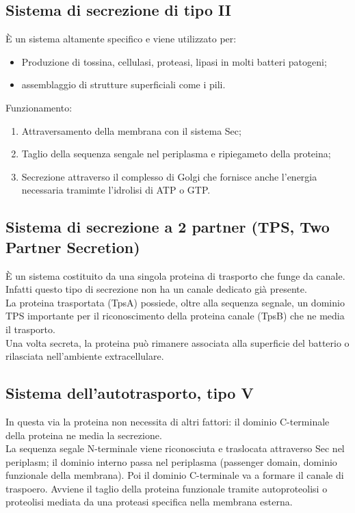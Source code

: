 \subsection{Sistema di secrezione di tipo II}
\`E un sistema altamente specifico e viene utilizzato per: 
\begin{itemize}
    \item Produzione di tossina, cellulasi, proteasi, lipasi in molti batteri patogeni; 
    \item assemblaggio di strutture superficiali come i pili.
\end{itemize}
Funzionamento:
\begin{enumerate}
    \item Attraversamento della membrana con il sistema Sec; 
    \item Taglio della sequenza sengale nel periplasma e ripiegameto della proteina;
    \item Secrezione attraverso il complesso di Golgi che fornisce anche l'energia necessaria tramimte l'idrolisi di ATP o GTP.
\end{enumerate}
\subsection{Sistema di secrezione a 2 partner (TPS, Two Partner Secretion)}
\`E un sistema costituito da una singola proteina di trasporto che funge da canale. Infatti questo tipo di secrezione non ha un canale dedicato gi\`a presente.
\\La proteina trasportata (TpsA) possiede, oltre alla sequenza segnale, un dominio TPS importante per il riconoscimento della proteina canale (TpsB) che ne media il trasporto. 
\\Una volta secreta, la proteina pu\`o rimanere associata alla superficie del batterio o rilasciata nell'ambiente extracellulare. 
\subsection{Sistema dell'autotrasporto, tipo V}
In questa via la proteina non necessita di altri fattori: il dominio C-terminale della proteina ne media la secrezione. 
\\La sequenza segale N-terminale viene riconosciuta e traslocata attraverso Sec nel periplasm; il dominio interno passa nel periplasma (passenger domain, dominio funzionale della membrana). Poi il dominio C-terminale va a formare il canale di traspoero. Avviene il taglio della proteina funzionale tramite autoproteolisi o proteolisi mediata da una proteasi specifica nella membrana esterna.
